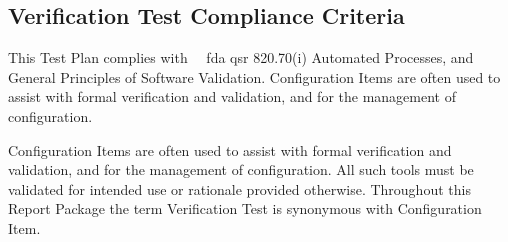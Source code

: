 \subsection{Verification Test Compliance Criteria}
This Test Plan complies with \sopSDLC\, \sopSCM\, \Gls{fda} \Gls{qsr}
820.70(i) Automated Processes, and General Principles of Software Validation.
Configuration Items are often used to assist with formal verification and
validation, and for the management of configuration.

Configuration Items are often used to assist with formal verification and
validation, and for the management of configuration.  All such tools must be
validated for intended use or rationale provided otherwise.  Throughout this
Report Package the term Verification Test is synonymous with Configuration Item.
